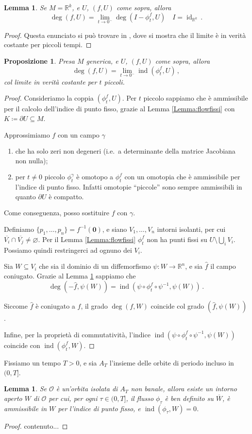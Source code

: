 \documentclass[a4paper, 11pt]{article}
\theoremstyle{definition}
\theoremstyle{plain}
\newtheorem{Lemma}[Def]{Lemma}
\newtheorem{Prop}[Def]{Proposizione}
\newcommand{\zero}{\mathbf{0}}
\newcommand{\OO}{\mathcal{O}}
\newcommand{\eset}{\varnothing}
\newcommand{\R}{\mathbb{R}}
\newcommand{\cl}[1]{\overline{#1}}
\newcommand{\deff}{\coloneqq}
\DeclareMathOperator{\id}{id}
\DeclareMathOperator{\ind}{ind}
\begin{document}
\begin{Lemma}\label{Lemma:degind}
	Se $M = \R^k$, e $U$, $(f,U)$ come sopra, allora
	\[
		\deg(f,U) = \lim_{t \to 0^-}\deg(I-\phi_t^f,U) \quad I = \id_{\R^k}\,.
	\]
\end{Lemma}
\begin{proof}
	Questa enunciato si può trovare in \cite[Prop. 3.3]{FuriPeraSpadini2000}, dove si mostra che il limite è in verità costante per piccoli tempi.
\end{proof}
\begin{Prop}
	Presa $M$ generica, e $U$, $(f,U)$ come sopra, allora
	\[
		\deg(f,U) = \lim_{t \to 0^-}\ind(\phi_t^f,U)\,,
	\]
	col limite in verità costante per $t$ piccoli.
\end{Prop}
\begin{proof}
	Consideriamo la coppia $(\phi_t^f,U)$. Per $t$ piccolo sappiamo che è ammissibile per il calcolo dell'indice di punto fisso, grazie al Lemma \ref{Lemma:flowfissi} con $K \deff \partial U \subseteq M$.

	Approssimiamo $f$ con un campo $\gamma$
	\begin{enumerate}
		\item che ha solo zeri non degeneri (i.e.\ a determinante della matrice Jacobiana non nulla);
		\item per $t \neq 0$ piccolo $\phi_t^\gamma$ è omotopo a $\phi_t^f$ con un omotopia che è ammissibile per l'indice di punto fisso. Infatti omotopie ``piccole'' sono sempre ammissibili in quanto $\partial U$ è compatto.
	\end{enumerate} 
	Come conseguenza, posso sostituire $f$ con $\gamma$. 
	
	Definiamo $\{p_1, \dots, p_n\} = f^{-1}(\zero)$, e siano $V_1, \dots, V_n$ intorni isolanti, per cui $\cl{V_i} \cap \cl{V_j} \neq \eset$. Per il Lemma \ref{Lemma:flowfissi} $\phi_t^f$ non ha punti fissi su $U \setminus \bigcup_iV_i$. Possiamo quindi restringerci ad ognuno dei $V_i$.
	
	Sia $W \subseteq V_i$ che sia il dominio di un diffemorfismo $\psi \colon W \to \R^n$, e sia $\hat{f}$ il campo coniugato. Grazie al Lemma \ref{Lemma:degind} sappiamo che
	\[
		\deg(-\hat{f}, \psi(W)) = \ind(\psi \circ \phi_t^f \circ \psi^{-1}, \psi(W))\,.
	\]
	
	Siccome $\hat{f}$ è coniugato a $f$, il grado $\deg(f,W)$ coincide col grado $(\hat{f}, \psi(W))$. 
	
	Infine, per la proprietà di commutatività, l'indice $\ind(\psi \circ \phi_t^f \circ \psi^{-1}, \psi(W))$ coincide con $\ind(\phi_t^f, W)$.
\end{proof}

Fissiamo un tempo $T > 0$, e sia $A_T$ l'insieme delle orbite di periodo incluso in $(0,T]$.
\begin{Lemma}
	Se $\OO$ è un'orbita isolata di $A_T$ non banale, allora esiste un intorno aperto $W$ di $\OO$ per cui, per ogni $\tau \in (0,T]$, il flusso $\phi_\tau$ è ben definito su $\cl{W}$, è ammissibile in $W$ per l'indice di punto fisso, e $\ind(\phi_\tau,W) = 0$.
\end{Lemma}
\begin{proof}
	contenuto...
\end{proof}
\printbibliography
\end{document}
